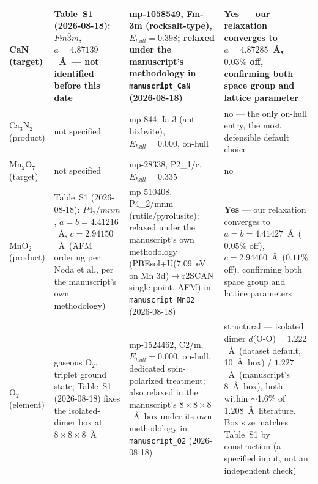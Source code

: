 \begin{longtable}{@{}p{2.6cm} p{3.0cm} p{3.6cm} p{5.2cm}@{}}
\midrule
CaN (target) & Table~S1 (2026-08-18): $Fm\bar{3}m$, $a=4.87139$~\AA\ --- not identified before this date & mp-1058549, Fm-3m (rocksalt-type), $E_{hull}=0.398$; relaxed under the manuscript's methodology in \texttt{manuscript\_CaN} (2026-08-18) & \textbf{Yes} --- our relaxation converges to $a=4.87285$~\AA, $0.03\%$ off, confirming both space group and lattice parameter \\
\midrule
Ca$_3$N$_2$ (product) & not specified & mp-844, Ia-3 (anti-bixbyite), $E_{hull}=0.000$, on-hull & no --- the only on-hull entry, the most defensible default choice \\
\midrule
Mn$_2$O$_7$ (target) & not specified & mp-28338, P2\_1/c, $E_{hull}=0.335$ & no \\
\midrule
MnO$_2$ (product) & Table~S1 (2026-08-18): $P4_2/mnm$, $a=b=4.41216$~\AA, $c=2.94150$~\AA\ (AFM ordering per Noda et al., per the manuscript's own methodology) & mp-510408, P4\_2/mnm (rutile/pyrolusite); relaxed under the manuscript's own methodology (PBEsol+U(7.09~eV on Mn 3d)$\to$r2SCAN single-point, AFM) in \texttt{manuscript\_MnO2} (2026-08-18) & \textbf{Yes} --- our relaxation converges to $a=b=4.41427$~\AA\ ($0.05\%$ off), $c=2.94460$~\AA\ ($0.11\%$ off), confirming both space group and lattice parameters \\
\midrule
O$_2$ (element) & gaseous O$_2$, triplet ground state; Table~S1 (2026-08-18) fixes the isolated-dimer box at $8\times8\times8$~\AA & mp-1524462, C2/m, $E_{hull}=0.000$, on-hull, dedicated spin-polarized treatment; also relaxed in the manuscript's $8\times8\times8$~\AA\ box under its own methodology in \texttt{manuscript\_O2} (2026-08-18) & structural --- isolated dimer $d$(O-O)$=1.222$~\AA\ (dataset default, 10~\AA\ box) / $1.227$~\AA\ (manuscript's 8~\AA\ box), both within $\sim$1.6\% of 1.208~\AA\ literature. Box size matches Table~S1 by construction (a specified input, not an independent check) \\
\end{longtable}

